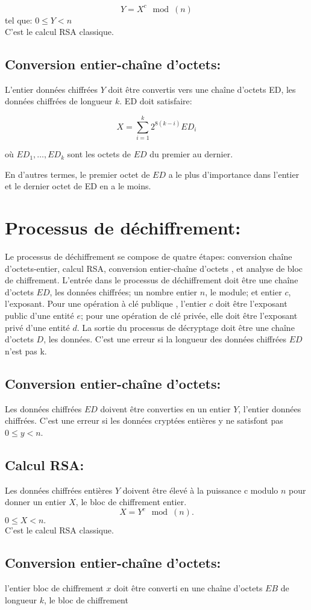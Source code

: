 \documentclass{article}
\begin{document}
            $$Y=X^c\mod(n)$$ tel que: $0\leq Y<n$
\\
C'est le calcul RSA classique.
\subsection{Conversion entier-chaîne d’octets:}
L’entier données chiffrées $Y$ doit être convertis vers une chaîne d'octets ED, les données chiffrées de longueur $k$. ED doit satisfaire:

       $$ X=\sum \limits_{i=1}^{k}2^{8(k-i)}ED_{i} $$
       
 où $ED_{1},\ldots,ED_{k}$ sont les octets de $ED$ du premier au dernier.

 En d'autres termes, le premier octet de $ED$ a le plus d'importance dans
 l'entier et le dernier octet de ED en a le moins.
 \section{Processus de déchiffrement:}
 Le processus de déchiffrement se compose de quatre étapes: conversion chaîne d’octets-entier, calcul RSA, conversion entier-chaîne d’octets , et analyse de bloc de chiffrement. L'entrée dans le processus de déchiffrement doit être une chaîne d'octets $ED$, les données chiffrées; un nombre entier $n$, le module; et entier $c$, l'exposant.
 Pour une opération à clé publique , l'entier $c$ doit être l'exposant public d'une entité $e$; pour une opération de clé privée, elle doit être l'exposant privé d'une entité $d$. La sortie du processus de décryptage doit être une chaîne d'octets $D$,  les données. C'est une erreur si la longueur des données chiffrées $ED$ n'est pas k.
\subsection{Conversion entier-chaîne d’octets:}
Les données chiffrées $ED$ doivent être converties en un entier $Y$, l'entier données chiffrées. 
C'est une erreur si les données cryptées entières y ne satisfont pas $0\leq y<n$.
\subsection{Calcul RSA:}
Les données chiffrées entières $Y$ doivent être élevé à la puissance c modulo $n$ pour donner un entier $X$, le bloc de chiffrement entier.
$$X=Y^c\mod(n).$$ $0\leq X<n.$\\
C'est le calcul RSA classique.
\subsection{Conversion entier-chaîne d’octets:}
l’entier  bloc de chiffrement $x$ doit être converti en une chaîne d'octets $EB$ de longueur $k$, le bloc de chiffrement
\end{document}
